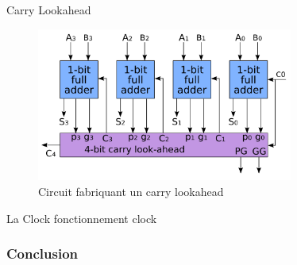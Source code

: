 \documentclass[12pt]{beamer}
\begin{document}
\begin{frame}{Carry Lookahead}
    \begin{figure}
        \centering
            \includegraphics[width=0.75\textwidth]{carry.png}
            \caption{Circuit fabriquant un carry lookahead}
            \label{fig:question}
        \end{figure}
\end{frame}

\begin{frame}{La Clock}
    fonctionnement clock
\end{frame}
    
\begin{frame}
\frametitle{Conclusion}
\begin{itemize}

\end{itemize}
\end{frame}
\end{document}
